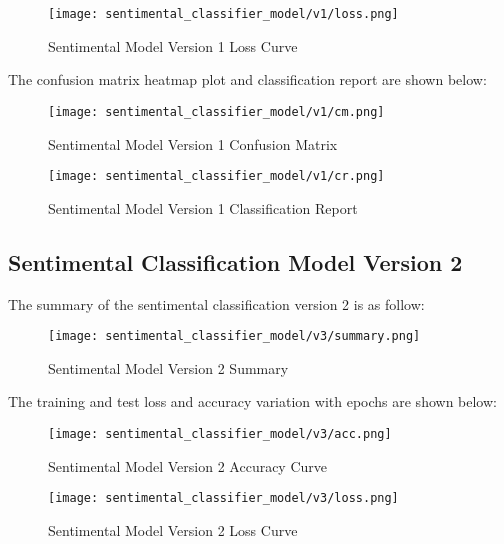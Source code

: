 \begin{figure}[H]
    \centering
    \texttt{[image: sentimental\_classifier\_model/v1/loss.png]}
    \caption{Sentimental Model Version 1 Loss Curve}
    \label{fig:Sentimental Model Version 1 loss curve}
\end{figure}

The confusion matrix heatmap plot and classification report are shown below:


\begin{figure}[H]
    \centering
    \texttt{[image: sentimental\_classifier\_model/v1/cm.png]}
    \caption{Sentimental Model Version 1 Confusion Matrix}
    \label{fig:Sentimental Model Version 1 Confusion Matrix}
\end{figure}

\begin{figure}[H]
    \centering
    \texttt{[image: sentimental\_classifier\_model/v1/cr.png]}
    \caption{Sentimental Model Version 1 Classification Report}
    \label{fig:Sentimental Model Version 1 Classification Report}
\end{figure}


\subsection{Sentimental Classification Model Version 2}
The summary of the sentimental classification version 2 is as follow:

\begin{figure}[H]
    \centering
    \texttt{[image: sentimental\_classifier\_model/v3/summary.png]}
    \caption{Sentimental Model Version 2 Summary}
    \label{fig:Sentimental Model Version 2 Summary}
\end{figure}

The training and test loss and accuracy variation with epochs are shown below:

\begin{figure}[H]
    \centering
    \texttt{[image: sentimental\_classifier\_model/v3/acc.png]}
    \caption{Sentimental Model Version 2 Accuracy Curve}
    \label{fig:Sentimental Model Version 2 accuracy curve}
\end{figure}

\begin{figure}[H]
    \centering
    \texttt{[image: sentimental\_classifier\_model/v3/loss.png]}
    \caption{Sentimental Model Version 2 Loss Curve}
    \label{fig:Sentimental Model Version 2 loss curve}
\end{figure}

